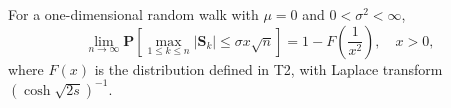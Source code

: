 For a one-dimensional random walk with $\mu = 0$ and $0 < \sigma^2 < \infty$,
$$\lim_{n \to \infty} \mathbf{P}\left[ \max_{1 \leq k \leq n} |\mathbf{S}_k| \leq \sigma x \sqrt{n} \right] = 1 - F\left(\frac{1}{x^2}\right), \quad x > 0,$$
where $F(x)$ is the distribution defined in T2, with Laplace transform $(\cosh \sqrt{2s})^{-1}$.
